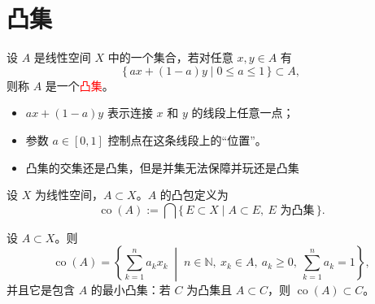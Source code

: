 \section{凸集}
\begin{definition}[凸集]
设 $A$ 是线性空间 $X$ 中的一个集合，若对任意 $x,y\in A$ 有
\[
\{\,a x + (1-a)y \mid 0\le a\le 1\,\} \subset A,
\]
则称 $A$ 是一个\textcolor{red}{凸集}。
\end{definition}
\begin{remark}
  \begin{itemize}
  \item $a x + (1-a)y$ 表示连接 $x$ 和 $y$ 的线段上任意一点；
  \item 参数 $a \in [0,1]$ 控制点在这条线段上的“位置”。
  \item 凸集的交集还是凸集，但是并集无法保障并玩还是凸集
\end{itemize}
\end{remark}
\begin{definition}
设 $X$ 为线性空间，$A\subset X$。$A$ 的凸包定义为
\[
\operatorname{co}(A)
:= \bigcap\{\,E \subset X \mid A\subset E,\ E \text{ 为凸集}\,\}.
\]
\end{definition}

\begin{proposition}
设 $A\subset X$。则
\[
\operatorname{co}(A)
= \left\{ \sum_{k=1}^n a_k x_k \;\middle|\;
n\in\mathbb{N},\ x_k\in A,\ a_k\ge 0,\ \sum_{k=1}^n a_k=1 \right\},
\]
并且它是包含 $A$ 的最小凸集：若 $C$ 为凸集且 $A\subset C$，则
\(\operatorname{co}(A)\subset C\)。
\end{proposition}

